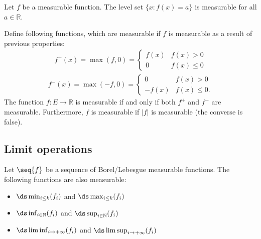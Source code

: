     \begin{property}
        Let $f$ be a measurable function. The level set $\{x:f(x) = a\}$ is measurable for all $a\in\mathbb{R}$.
    \end{property}

    \begin{property}
        Define following functions, which are measurable if $f$ is measurable as a result of previous properties:
        \begin{gather}
            \label{lebesgue:positive_part}
            f^+(x) = \max(f,0) =
            \begin{cases}
                f(x)&f(x)>0\\
                0&f(x)\leq0
            \end{cases}
        \end{gather}
        \begin{gather}
            \label{lebesgue:negative_part}
            f^-(x) = \max(-f,0) =
            \begin{cases}
                0&f(x)>0\\
                -f(x)&f(x)\leq0.
            \end{cases}
        \end{gather}
        The function $f:E\rightarrow\mathbb{R}$ is measurable if and only if both $f^+$ and $f^-$ are measurable. Furthermore, $f$ is measurable if $|f|$ is measurable (the converse is false).
    \end{property}

\subsection{Limit operations}

    \begin{property}
        Let $\seq{f}$ be a sequence of Borel/Lebesgue measurable functions. The following functions are also measurable:
        \begin{itemize}
            \item $\ds\min_{i\leq k}(f_i)$ and $\ds\max_{i\leq k}(f_i)$
            \item $\ds\inf_{i\in\mathbb{N}}(f_i)$ and $\ds\sup_{i\in\mathbb{N}}(f_i)$
            \item $\ds\liminf_{i\rightarrow+\infty}(f_i)$ and $\ds\limsup_{i\rightarrow+\infty}(f_i)$
        \end{itemize}
    \end{property}

